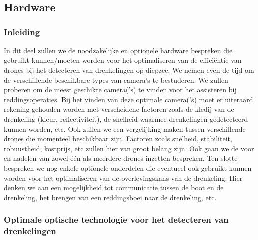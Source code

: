 \chapter{}
\label{ch:stand-van-zaken}



\section{Hardware}

\subsection{Inleiding}

In dit deel zullen we de noodzakelijke en optionele hardware bespreken die gebruikt kunnen/moeten worden voor het optimaliseren van de efficiëntie van drones bij het detecteren van drenkelingen op diepzee. We nemen even de tijd om de verschillende beschikbare types van camera's te bestuderen. We zullen proberen om de meest geschikte camera('s) te vinden voor het assisteren bij reddingsoperaties. Bij het vinden van deze optimale camera('s) moet er uiteraard rekening gehouden worden met verscheidene factoren zoals de kledij van de drenkeling (kleur, reflectiviteit), de snelheid waarmee drenkelingen gedetecteerd kunnen worden, etc. Ook zullen we een vergelijking maken tussen verschillende drones die momenteel beschikbaar zijn. Factoren zoals snelheid, stabiliteit, robuustheid, kostprijs, etc zullen hier van groot belang zijn. Ook gaan we de voor en nadelen van zowel één als meerdere drones inzetten bespreken. Ten slotte bespreken we nog enkele optionele onderdelen die eventueel ook gebruikt kunnen worden voor het optimaliseren van de overlevingskans van de drenkeling. Hier denken we aan een mogelijkheid tot communicatie tussen de boot en de drenkeling, het brengen van een reddingsboei naar de drenkeling, etc.

\subsection{Optimale optische technologie voor het detecteren van drenkelingen}

